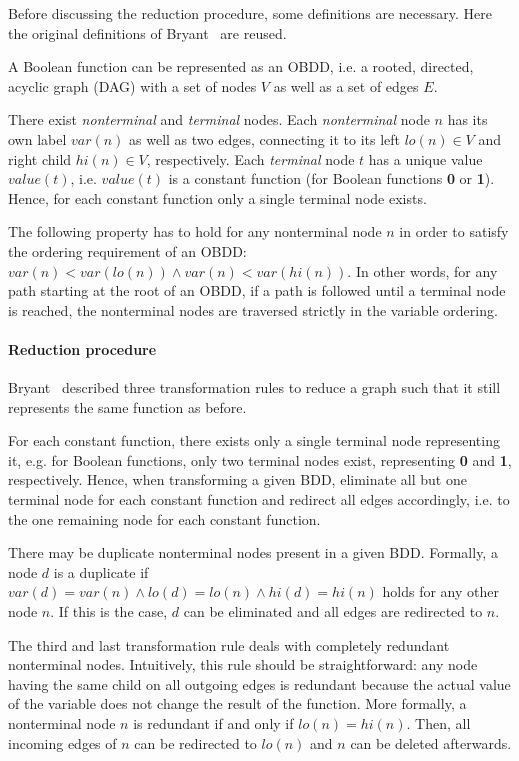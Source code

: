 \documentclass{vldb}
\begin{document}
Before discussing the reduction procedure, some definitions are necessary. Here
the original definitions of Bryant~\cite{BRYANT86, BRYANT91} are reused.

A Boolean function can be represented as an OBDD, i.e. a rooted, directed,
acyclic graph (DAG) with a set of nodes $V$ as well as a set of edges $E$. 

There exist \textit{nonterminal} and \textit{terminal} nodes. Each
\textit{nonterminal} node $n$ has its own label $var(n)$ as well as two edges,
connecting it to its left $lo(n)\in V$ and right child $hi(n)\in V$, respectively. 
Each \textit{terminal} node $t$ has a unique value $value(t)$, i.e. $value(t)$
is a constant function (for Boolean functions \textbf{0} or \textbf{1}). Hence,
for each constant function only a single terminal node exists.

The following property has to hold for any nonterminal node $n$ in order to
satisfy the ordering requirement of an OBDD:
$var(n) < var(lo(n)) \land var(n) < var(hi(n))$.
In other words, for any path starting at the root of an OBDD, if a path is
followed until a terminal node is reached, the nonterminal nodes are traversed
strictly in the variable ordering.

\paragraph*{Reduction procedure}
\mbox{} %

Bryant~\cite{BRYANT86, BRYANT92} described three transformation rules to reduce
a graph such that it still represents the same function as before.

For each constant function, there exists only a single terminal node representing
it, e.g. for Boolean functions, only two terminal nodes exist, representing
\textbf{0} and \textbf{1}, respectively. Hence, when transforming a given BDD,
eliminate all but one terminal node for each constant function and redirect all
edges accordingly, i.e. to the one remaining node for each constant function.

There may be duplicate nonterminal nodes present in a given BDD. Formally, a node
$d$ is a duplicate if $var(d) = var(n) \land lo(d) = lo(n) \land hi(d) = hi(n)$
holds for any other node $n$. If this is the case, $d$ can be eliminated and all
edges are redirected to $n$.

The third and last transformation rule deals with completely redundant nonterminal
nodes. Intuitively, this rule should be straightforward: any node having the same
child on all outgoing edges is redundant because the actual value of the variable
does not change the result of the function. More formally, a nonterminal node $n$
is redundant if and only if $lo(n) = hi(n)$. Then, all incoming edges of $n$ can
be redirected to $lo(n)$ and $n$ can be deleted afterwards.
\end{document}
